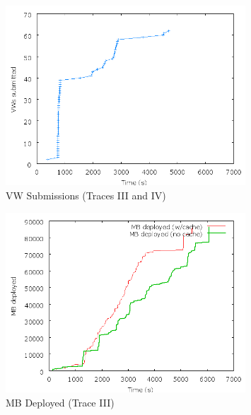 \begin{figure}
  \begin{center}
    \includegraphics[width=0.8\textwidth]{figures/ProviderPerspective-TraceShape.png}
    \caption{VW Submissions (Traces III and IV)}
	\label{fig:providershape}
  \end{center}
\end{figure}

\begin{figure}
  \begin{center}
    \includegraphics[width=0.8\textwidth]{figures/ProviderPerspective-Uniform2.png}
    \caption{MB Deployed (Trace III)}
	\label{fig:providerIII}
  \end{center}
\end{figure}

